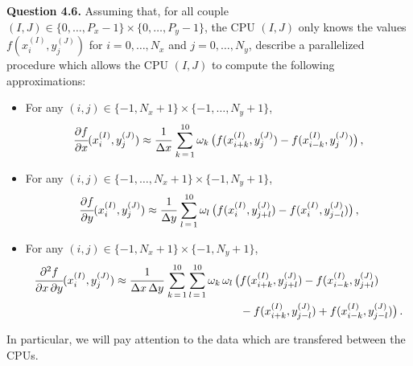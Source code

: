 \documentclass[10pt]{article}
\newcommand{\D}{{\partial}}
\begin{document}
\begin{leftbar}
\textbf{Question 4.6.} Assuming that, for all couple $(I,J) \in \{0,\dots,P_{x}-1\}\times\{0,\dots,P_{y}-1\}$, the CPU $(I,J)$ only knows the values $f(x_{i}^{(I)},y_{j}^{(J)})$ for $i=0,\dots,N_{x}$ and $j=0,\dots,N_{y}$, describe a parallelized procedure which allows the CPU $(I,J)$ to compute the following approximations:
\begin{itemize}
\item For any $(i,j) \in \{-1,N_{x}+1\} \times \{-1,\dots,N_{y}+1\}$, 
\begin{equation} \label{conditions_Hermite_2D_local_1}
\cfrac{\D f}{\D x}(x_{i}^{(I)},y_{j}^{(J)}) \approx \cfrac{1}{\Delta x}\, \sum_{k\,=\,1}^{10} \omega_{k}\,\big(f(x_{i+k}^{(I)},y_{j}^{(J)}) - f(x_{i-k}^{(I)},y_{j}^{(J)}) \big) \, ,
\end{equation}
\item For any $(i,j) \in \{-1,\dots,N_{x}+1\} \times \{-1,N_{y}+1\}$,
\begin{equation} \label{conditions_Hermite_2D_local_2}
\cfrac{\D f}{\D y}(x_{i}^{(I)},y_{j}^{(J)}) \approx \displaystyle \cfrac{1}{\Delta y}\, \sum_{l\,=\,1}^{10} \omega_{l}\,\big(f(x_{i}^{(I)},y_{j+l}^{(J)}) - f(x_{i}^{(I)},y_{j-l}^{(J)}) \big) \, ,
\end{equation}
\item For any $(i,j) \in \{-1,N_{x}+1\} \times \{-1,N_{y}+1\}$,
\begin{equation} \label{conditions_Hermite_2D_local_3}
\begin{split}
\cfrac{\D^{2}f}{\D x\,\D y}(x_{i}^{(I)},y_{j}^{(J)}) \approx \cfrac{1}{\Delta x\,\Delta y} \, \sum_{k\,=\,1}^{10} \sum_{l\,=\,1}^{10} \omega_{k}\,\omega_{l}\, \big(&f(x_{i+k}^{(I)},y_{j+l}^{(J)}) - f(x_{i-k}^{(I)},y_{j+l}^{(J)}) \\
&- f(x_{i+k}^{(I)},y_{j-l}^{(J)}) + f(x_{i-k}^{(I)},y_{j-l}^{(J)}) \big)\, .
\end{split}
\end{equation}
\end{itemize}
In particular, we will pay attention to the data which are transfered between the CPUs.
\end{leftbar}
\end{document}
